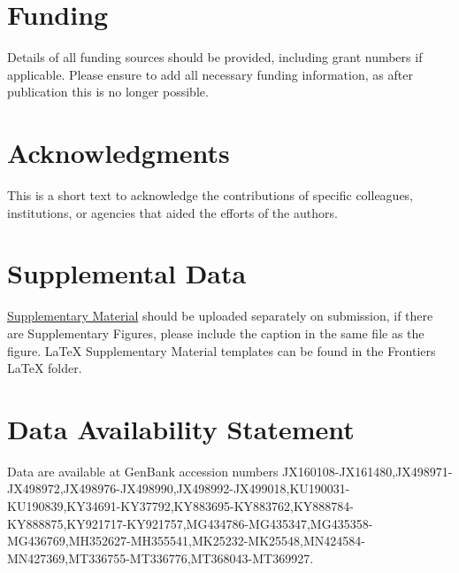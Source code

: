 \documentclass[utf8]{FrontiersinHarvard} %
\begin{document}
\section*{Funding}
Details of all funding sources should be provided, including grant numbers if applicable. Please ensure to add all necessary funding information, as after publication this is no longer possible.

\section*{Acknowledgments}
This is a short text to acknowledge the contributions of specific colleagues, institutions, or agencies that aided the efforts of the authors.

\section*{Supplemental Data}
 \href{https://www.frontiersin.org/guidelines/author-guidelines#supplementary-material}{Supplementary Material} should be uploaded separately on submission, if there are Supplementary Figures, please include the caption in the same file as the figure. LaTeX Supplementary Material templates can be found in the Frontiers LaTeX folder.

\section*{Data Availability Statement}

Data are available at GenBank accession numbers
JX160108-JX161480,JX498971-JX498972,JX498976-JX498990,JX498992-JX499018,KU190031-KU190839,KY34691-KY37792,KY883695-KY883762,KY888784-KY888875,KY921717-KY921757,MG434786-MG435347,MG435358-MG436769,MH352627-MH355541,MK25232-MK25548,MN424584-MN427369,MT336755-MT336776,MT368043-MT369927.


\nocite{*}
\end{document}
